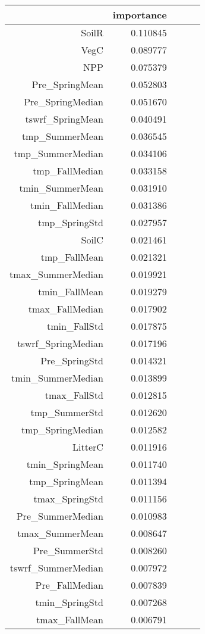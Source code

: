 \begin{table}[h]
\centering
\label{table:5}
\begin{tabular}{rrrrr}
\toprule
 & importance \\
\midrule
SoilR & 0.110845 \\
VegC & 0.089777 \\
NPP & 0.075379 \\
Pre_SpringMean & 0.052803 \\
Pre_SpringMedian & 0.051670 \\
tswrf_SpringMean & 0.040491 \\
tmp_SummerMean & 0.036545 \\
tmp_SummerMedian & 0.034106 \\
tmp_FallMedian & 0.033158 \\
tmin_SummerMean & 0.031910 \\
tmin_FallMedian & 0.031386 \\
tmp_SpringStd & 0.027957 \\
SoilC & 0.021461 \\
tmp_FallMean & 0.021321 \\
tmax_SummerMedian & 0.019921 \\
tmin_FallMean & 0.019279 \\
tmax_FallMedian & 0.017902 \\
tmin_FallStd & 0.017875 \\
tswrf_SpringMedian & 0.017196 \\
Pre_SpringStd & 0.014321 \\
tmin_SummerMedian & 0.013899 \\
tmax_FallStd & 0.012815 \\
tmp_SummerStd & 0.012620 \\
tmp_SpringMedian & 0.012582 \\
LitterC & 0.011916 \\
tmin_SpringMean & 0.011740 \\
tmp_SpringMean & 0.011394 \\
tmax_SpringStd & 0.011156 \\
Pre_SummerMedian & 0.010983 \\
tmax_SummerMean & 0.008647 \\
Pre_SummerStd & 0.008260 \\
tswrf_SummerMedian & 0.007972 \\
Pre_FallMedian & 0.007839 \\
tmin_SpringStd & 0.007268 \\
tmax_FallMean & 0.006791 \\

\end{tabular}
\end{table}
